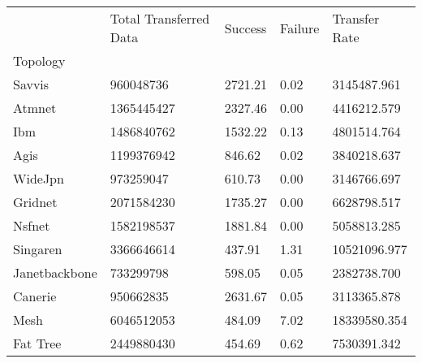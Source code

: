 \begin{tabular}{lllll}
 & Total Transferred Data & Success & Failure & Transfer Rate \\
Topology &  &  &  &  \\
Savvis & 960048736 & 2721.21 & 0.02 & 3145487.961 \\
Atmnet & 1365445427 & 2327.46 & 0.00 & 4416212.579 \\
Ibm & 1486840762 & 1532.22 & 0.13 & 4801514.764 \\
Agis & 1199376942 & 846.62 & 0.02 & 3840218.637 \\
WideJpn & 973259047 & 610.73 & 0.00 & 3146766.697 \\
Gridnet & 2071584230 & 1735.27 & 0.00 & 6628798.517 \\
Nsfnet & 1582198537 & 1881.84 & 0.00 & 5058813.285 \\
Singaren & 3366646614 & 437.91 & 1.31 & 10521096.977 \\
Janetbackbone & 733299798 & 598.05 & 0.05 & 2382738.700 \\
Canerie & 950662835 & 2631.67 & 0.05 & 3113365.878 \\
Mesh & 6046512053 & 484.09 & 7.02 & 18339580.354 \\
Fat Tree & 2449880430 & 454.69 & 0.62 & 7530391.342 \\
\end{tabular}
